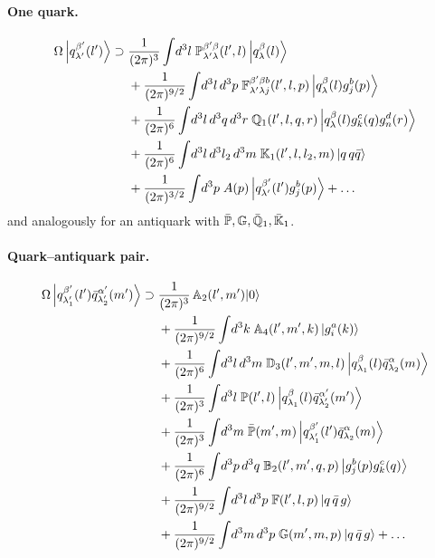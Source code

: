 \paragraph{One quark.}
\begin{align}
\Omega\left|q^{\beta'}_{\lambda'}(l')\right\rangle\supset\;&\frac{1}{(2\pi)^{3}}\int\!d^{3}l\;
\mathbb{P}^{\beta'\beta}_{\lambda'\lambda}(l',l)\left|q^{\beta}_{\lambda}(l)\right\rangle
\nonumber\\
&+\frac{1}{(2\pi)^{9/2}}\int\!d^{3}l\,d^{3}p\;\mathbb{F}^{\beta'\beta b}_{\lambda'\lambda j}(l',l,p)
\left|q^{\beta}_{\lambda}(l)g^{b}_{j}(p)\right\rangle
\nonumber\\
&+\frac{1}{(2\pi)^{6}}\int\!d^{3}l\,d^{3}q\,d^{3}r\;\mathbb{Q}_{1}(l',l,q,r)\left|q^{\beta}_{\lambda}(l)g^{c}_{k}(q)g^{d}_{n}(r)\right\rangle
\nonumber\\
&+\frac{1}{(2\pi)^{6}}\int\!d^{3}l\,d^{3}l_{2}\,d^{3}m\;\mathbb{K}_{1}(l',l,l_{2},m)\left|q\,q\bar q\right\rangle
\nonumber\\
&+\frac{1}{(2\pi)^{3/2}}\int\!d^{3}p\;A(p)\left|q^{\beta'}_{\lambda'}(l')g^{b}_{j}(p)\right\rangle+\dots
\label{eq:Omq}
\end{align}
and analogously for an antiquark with $\bar{\mathbb{P}},\mathbb{G},\bar{\mathbb{Q}}_{1},\bar{\mathbb{K}}_{1}$.

\paragraph{Quark--antiquark pair.}
\begin{align}
\Omega\left|q^{\beta'}_{\lambda_{1}'}(l')\bar q^{\alpha'}_{\lambda_{2}'}(m')\right\rangle\supset\;&
\frac{1}{(2\pi)^{3}}\,\mathbb{A}_{2}(l',m')|0\rangle
\nonumber\\
&+\frac{1}{(2\pi)^{9/2}}\int\!d^{3}k\;\mathbb{A}_{4}(l',m',k)\left|g^{a}_{i}(k)\right\rangle
\nonumber\\
&+\frac{1}{(2\pi)^{6}}\int\!d^{3}l\,d^{3}m\;\mathbb{D}_{3}(l',m',m,l)\left|q^{\beta}_{\lambda_{1}}(l)\bar q^{\alpha}_{\lambda_{2}}(m)\right\rangle
\nonumber\\
&+\frac{1}{(2\pi)^{3}}\int\!d^{3}l\;\mathbb{P}(l',l)\left|q^{\beta}_{\lambda_{1}}(l)\bar q^{\alpha'}_{\lambda_{2}'}(m')\right\rangle
\nonumber\\
&+\frac{1}{(2\pi)^{3}}\int\!d^{3}m\;\bar{\mathbb{P}}(m',m)\left|q^{\beta'}_{\lambda_{1}'}(l')\bar q^{\alpha}_{\lambda_{2}}(m)\right\rangle
\nonumber\\
&+\frac{1}{(2\pi)^{6}}\int\!d^{3}p\,d^{3}q\;\mathbb{B}_{2}(l',m',q,p)\left|g^{b}_{j}(p)g^{c}_{k}(q)\right\rangle
\nonumber\\
&+\frac{1}{(2\pi)^{9/2}}\int\!d^{3}l\,d^{3}p\;\mathbb{F}(l',l,p)\left|q\,\bar q\,g\right\rangle
\nonumber\\
&+\frac{1}{(2\pi)^{9/2}}\int\!d^{3}m\,d^{3}p\;\mathbb{G}(m',m,p)\left|q\,\bar q\,g\right\rangle+\dots
\label{eq:Omqq}
\end{align}

